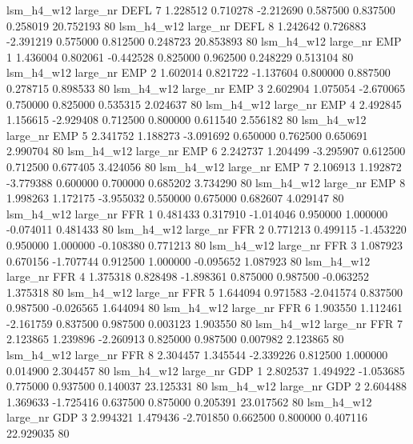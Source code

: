   lsm_h4_w12   large_nr     DEFL                 7  1.228512  0.710278  -2.212690 0.587500 0.837500  0.258019   20.752193 80
  lsm_h4_w12   large_nr     DEFL                 8  1.242642  0.726883  -2.391219 0.575000 0.812500  0.248723   20.853893 80
  lsm_h4_w12   large_nr      EMP                 1  1.436004  0.802061  -0.442528 0.825000 0.962500  0.248229    0.513104 80
  lsm_h4_w12   large_nr      EMP                 2  1.602014  0.821722  -1.137604 0.800000 0.887500  0.278715    0.898533 80
  lsm_h4_w12   large_nr      EMP                 3  2.602904  1.075054  -2.670065 0.750000 0.825000  0.535315    2.024637 80
  lsm_h4_w12   large_nr      EMP                 4  2.492845  1.156615  -2.929408 0.712500 0.800000  0.611540    2.556182 80
  lsm_h4_w12   large_nr      EMP                 5  2.341752  1.188273  -3.091692 0.650000 0.762500  0.650691    2.990704 80
  lsm_h4_w12   large_nr      EMP                 6  2.242737  1.204499  -3.295907 0.612500 0.712500  0.677405    3.424056 80
  lsm_h4_w12   large_nr      EMP                 7  2.106913  1.192872  -3.779388 0.600000 0.700000  0.685202    3.734290 80
  lsm_h4_w12   large_nr      EMP                 8  1.998263  1.172175  -3.955032 0.550000 0.675000  0.682607    4.029147 80
  lsm_h4_w12   large_nr      FFR                 1  0.481433  0.317910  -1.014046 0.950000 1.000000 -0.074011    0.481433 80
  lsm_h4_w12   large_nr      FFR                 2  0.771213  0.499115  -1.453220 0.950000 1.000000 -0.108380    0.771213 80
  lsm_h4_w12   large_nr      FFR                 3  1.087923  0.670156  -1.707744 0.912500 1.000000 -0.095652    1.087923 80
  lsm_h4_w12   large_nr      FFR                 4  1.375318  0.828498  -1.898361 0.875000 0.987500 -0.063252    1.375318 80
  lsm_h4_w12   large_nr      FFR                 5  1.644094  0.971583  -2.041574 0.837500 0.987500 -0.026565    1.644094 80
  lsm_h4_w12   large_nr      FFR                 6  1.903550  1.112461  -2.161759 0.837500 0.987500  0.003123    1.903550 80
  lsm_h4_w12   large_nr      FFR                 7  2.123865  1.239896  -2.260913 0.825000 0.987500  0.007982    2.123865 80
  lsm_h4_w12   large_nr      FFR                 8  2.304457  1.345544  -2.339226 0.812500 1.000000  0.014900    2.304457 80
  lsm_h4_w12   large_nr      GDP                 1  2.802537  1.494922  -1.053685 0.775000 0.937500  0.140037   23.125331 80
  lsm_h4_w12   large_nr      GDP                 2  2.604488  1.369633  -1.725416 0.637500 0.875000  0.205391   23.017562 80
  lsm_h4_w12   large_nr      GDP                 3  2.994321  1.479436  -2.701850 0.662500 0.800000  0.407116   22.929035 80
